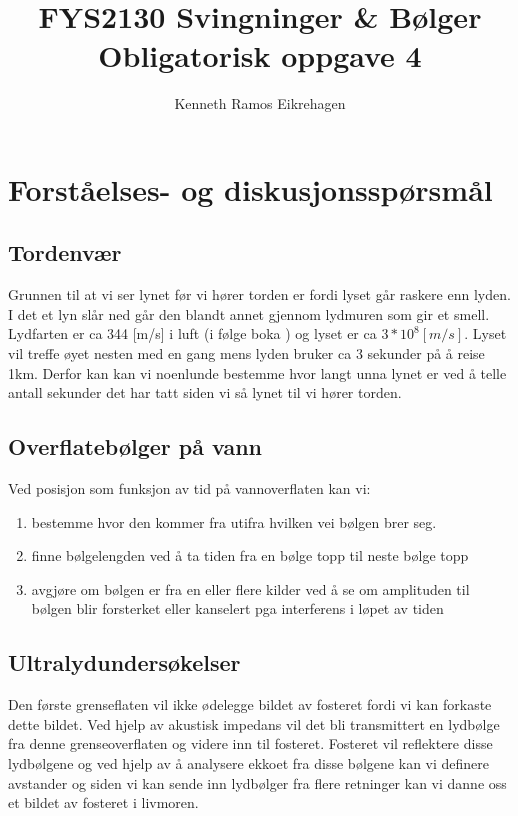 \documentclass[a4paper,12pt,norsk]{article}
\title{FYS2130 Svingninger \& Bølger \\Obligatorisk oppgave 4}
\author{Kenneth Ramos Eikrehagen}
\begin{document}
\maketitle
\newpage
\tableofcontents
\listoffigures
\newpage


\section{Forståelses- og diskusjonsspørsmål}
\subsection{Tordenvær}
Grunnen til at vi ser lynet før vi hører torden er fordi lyset går raskere enn lyden. I det et lyn slår ned går den blandt annet gjennom lydmuren som gir et smell. Lydfarten er ca 344 [m/s] i luft (i følge boka \cite{boka}) og lyset er ca $3*10^8[m/s]$. Lyset vil treffe øyet nesten med en gang mens lyden bruker ca 3 sekunder på å reise 1km. Derfor kan kan vi noenlunde bestemme hvor langt unna lynet er ved å telle antall sekunder det har tatt siden vi så lynet til vi hører torden.


\subsection{Overflatebølger på vann}
Ved posisjon som funksjon av tid på vannoverflaten kan vi:
\begin{enumerate}[label = \alph*)]
\item
bestemme hvor den kommer fra utifra hvilken vei bølgen brer seg.
\item
finne bølgelengden ved å ta tiden fra en bølge topp til neste bølge topp
\item
avgjøre om bølgen er fra en eller flere kilder ved å se om amplituden til bølgen blir forsterket eller kanselert pga interferens i løpet av tiden 
\end{enumerate}

\subsection{Ultralydundersøkelser}
Den første grenseflaten vil ikke ødelegge bildet av fosteret fordi vi kan forkaste dette bildet. Ved hjelp av akustisk impedans vil det bli transmittert en lydbølge fra denne grenseoverflaten og videre inn til fosteret. Fosteret vil reflektere disse lydbølgene og ved hjelp av å analysere ekkoet fra disse bølgene kan vi definere avstander og siden vi kan sende inn lydbølger fra flere retninger kan vi danne oss et bildet av fosteret i livmoren. 
\end{document}
